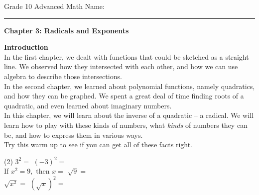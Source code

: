 \documentclass[12pt,fleqn]{book}
\begin{document}
\noindent
\thispagestyle{empty}
Grade 10 Advanced Math \hfill Name: \hspace{2in}
\medskip\hrule
\noindent

\vfill

\begin{center}
	{\bf \huge Chapter 3: Radicals and Exponents}
\end{center}

\vfill
\vfill

\clearpage

\setcounter{page}{1}

{\bf \huge Introduction }
\\[1in]
In the first chapter, we dealt with functions that could be sketched as a straight line.  We observed how they intersected with each other, and how we can use algebra to describe those intersections.
\\[1em]
In the second chapter, we learned about polynomial functions, namely quadratics, and how they can be graphed.  We spent a great deal of time finding roots of a quadratic, and even learned about imaginary numbers.
\\[1em]
In this chapter, we will learn about the inverse of a quadratic -- a radical.  We will learn how to play with these kinds of numbers, what \emph{kinds} of numbers they can be, and how to express them in various ways.
\\[1em]
Try this warm up to see if you can get all of these facts right.
\begin{tasks}(2)
    \task $3^2=$
    \task $(-3)^2=$
    \\[1em]
    \task If $x^2=9,$ then $x=$
    \task $\sqrt 9 =$
    \\[1em]
    \task $\sqrt{x^2}=$
    \task $(\sqrt x)^2=$
\end{tasks}
\clearpage
\end{document}

